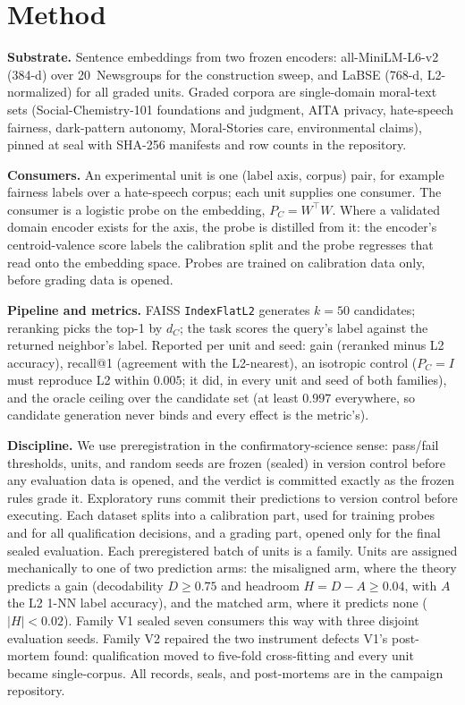 \documentclass{article}
\begin{document}
\section{Method}

\textbf{Substrate.} Sentence embeddings from two frozen encoders:
all-MiniLM-L6-v2 (384-d) over 20~Newsgroups for the construction sweep, and
LaBSE (768-d, L2-normalized) for all graded units. Graded corpora are
single-domain moral-text sets (Social-Chemistry-101 foundations and
judgment, AITA privacy, hate-speech fairness, dark-pattern autonomy,
Moral-Stories care, environmental claims), pinned at seal with SHA-256
manifests and row counts in the repository.

\textbf{Consumers.} An experimental unit is one (label axis, corpus)
pair, for example fairness labels over a hate-speech corpus; each unit
supplies one consumer. The consumer is a
logistic probe on the embedding, $P_C=W^\top W$. Where a validated
domain encoder exists for the axis, the probe is distilled from it: the
encoder's centroid-valence score labels the calibration split and the probe
regresses that read onto the embedding space. Probes are trained on
calibration data only, before grading data is opened.

\textbf{Pipeline and metrics.} FAISS \texttt{IndexFlatL2} generates $k=50$
candidates; reranking picks the top-1 by $d_C$; the task scores the query's
label against the returned neighbor's label. Reported per unit and seed:
gain (reranked minus L2 accuracy), recall@1 (agreement with the L2-nearest),
an isotropic control ($P_C=I$ must reproduce L2 within $0.005$; it did, in
every unit and seed of both families), and the oracle ceiling over the
candidate set (at least $0.997$ everywhere, so candidate generation never
binds and every effect is the metric's).

\textbf{Discipline.} We use preregistration in the confirmatory-science
sense: pass/fail thresholds, units, and random seeds are frozen (sealed) in
version control before any evaluation data is opened, and the verdict is
committed exactly as the frozen rules grade it. Exploratory runs commit
their predictions to version control before executing. Each dataset splits
into a calibration part, used for training probes and for all
qualification decisions, and a grading part, opened only for the final
sealed evaluation. Each preregistered batch of units is a family. Units are
assigned mechanically to one of two prediction arms: the misaligned arm,
where the theory predicts a gain (decodability $D\ge0.75$ and headroom
$H=D-A\ge0.04$, with $A$ the L2 1-NN label accuracy), and the matched arm,
where it predicts none ($|H|<0.02$). Family V1 sealed seven consumers this
way with three disjoint evaluation seeds. Family V2 repaired the two
instrument defects V1's post-mortem found: qualification moved to five-fold
cross-fitting and every unit became single-corpus. All records,
seals, and post-mortems are in the campaign repository.
\end{document}

